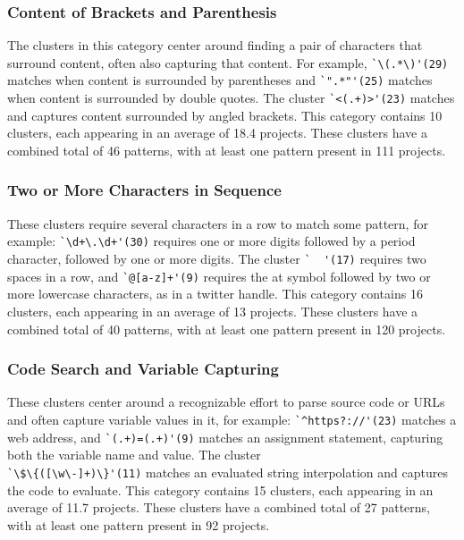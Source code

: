 \subsubsection{Content of Brackets and Parenthesis}
\label{cluster:contentparens}
The clusters in this category center around finding a pair of characters that surround content, often also capturing that content. For example,
\verb!`\(.*\)'(29)! matches when content is surrounded by parentheses and \verb!`".*"'(25)! matches  when content is surrounded by double quotes.  The cluster \verb!`<(.+)>'(23)! matches and captures content surrounded by angled brackets.
This category contains 10 clusters, each appearing in an average of 18.4 projects.  These clusters have a combined total of 46 patterns, with at least one pattern present in 111 projects.
\subsubsection{Two or More Characters in Sequence}
These clusters require several characters in a row to match some pattern, for example:
\verb!`\d+\.\d+'(30)! requires one or more digits followed by a period character, followed by one or more digits.  The cluster \verb!`  '(17)! requires two spaces in a row,
and \verb!`@[a-z]+'(9)! requires the at symbol followed by two or more lowercase characters, as in a twitter handle.
This category contains 16 clusters, each appearing in an average of 13 projects.  These clusters have a combined total of 40 patterns, with at least one pattern present in 120 projects.

\subsubsection{Code Search and Variable Capturing}
These clusters center around a recognizable effort to parse source code or URLs and often capture variable values in it, for example:
\verb!`^https?://'(23)! matches a web address, and \verb!`(.+)=(.+)'(9)! matches an assignment statement, capturing both the variable name and value.  The cluster \\ \verb!`\$\{([\w\-]+)\}'(11)! matches an evaluated string interpolation and captures the code to evaluate.
This category contains 15 clusters, each appearing in an average of 11.7 projects.  These clusters have a combined total of 27 patterns, with at least one pattern present in 92 projects.

